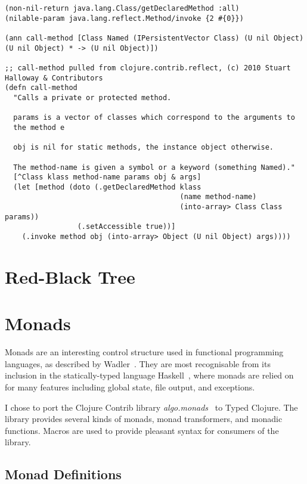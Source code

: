 \begin{lstlisting}
(non-nil-return java.lang.Class/getDeclaredMethod :all)
(nilable-param java.lang.reflect.Method/invoke {2 #{0}})

(ann call-method [Class Named (IPersistentVector Class) (U nil Object) (U nil Object) * -> (U nil Object)])

;; call-method pulled from clojure.contrib.reflect, (c) 2010 Stuart Halloway & Contributors
(defn call-method
  "Calls a private or protected method.

  params is a vector of classes which correspond to the arguments to
  the method e

  obj is nil for static methods, the instance object otherwise.

  The method-name is given a symbol or a keyword (something Named)."
  [^Class klass method-name params obj & args]
  (let [method (doto (.getDeclaredMethod klass 
                                         (name method-name)
                                         (into-array> Class Class params))
                 (.setAccessible true))]
    (.invoke method obj (into-array> Object (U nil Object) args))))
\end{lstlisting}

\section{Red-Black Tree}

\section{Monads}
\label{sec:monads}

Monads are an interesting control structure used in functional programming languages,
as described by Wadler~\cite{Wad95}.
They are most recognisable from its inclusion in the statically-typed language Haskell~\cite{Mar10},
where monads are relied on for many features including global state, file output, and exceptions.

I chose to port the Clojure Contrib library \emph{algo.monads}~\cite{Hic12} to Typed Clojure. The library
provides several kinds of monads, monad transformers, and monadic functions.
Macros are used to provide pleasant syntax for consumers of the library.

\subsection{Monad Definitions}
\label{sec:monaddef}

